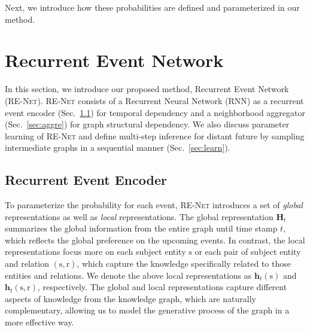 \documentclass[11pt,a4paper]{article}
\newcommand{\xiang}[1]{{{\textcolor{red}{[Xiang: #1]}}}}
\newcommand{\bH}{\boldsymbol{H}}
\newcommand{\bh}{\boldsymbol{h}}
\newcommand{\prob}{p}
\newcommand{\calE}{G}
\newcommand{\method}{\textsc{RE-Net}\xspace}
\newcommand{\teN}{\text{N}}
\newcommand{\bs}{\mathrm{s}}
\newcommand{\br}{\mathrm{r}}
\newcommand{\bo}{\mathrm{o}}
\renewcommand{\bh}{\boldsymbol{h}}
\begin{document}
Next, we introduce how these probabilities are defined and parameterized in our method.


\section{Recurrent Event Network}
\label{sec:re-net}
In this section, we introduce our proposed method, Recurrent Event Network (\method).
\method consists of a Recurrent Neural Network (RNN) as a recurrent event encoder (Sec.~\ref{sec:encoder}) for temporal dependency and a neighborhood aggregator (Sec.~\ref{sec:aggre}) for graph structural dependency.
We also discuss parameter learning of \method and define multi-step inference for distant future by sampling intermediate graphs in a sequential manner (Sec.~\ref{sec:learn}). 


\subsection{Recurrent Event Encoder}
\label{sec:encoder}

To parameterize the probability for each event, \method introduces a set of \textit{global} representations as well as \textit{local} representations. The global representation $\bH_{t}$ summarizes the global information from the entire graph until time stamp $t$, which reflects the global preference on the upcoming events. In contrast, the local representations focus more on each subject entity $\bs$ or each pair of subject entity and relation $(\bs,\br)$, which capture the knowledge specifically related to those entities and relations. 
We denote the above local representations as $\bh_{t}(\bs)$ and $\bh_{t}(\bs,\br)$, respectively. 
The global and local representations capture different aspects of knowledge from the knowledge graph, which are naturally complementary, allowing us to model the generative process of the graph in a more effective way.
\end{document}
